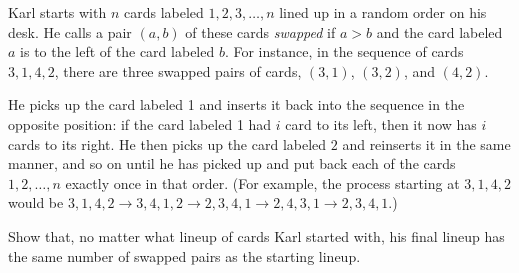 Karl starts with $n$ cards labeled $1,2,3,\dots,n$ lined up in a random order on his desk. He calls a pair $(a,b)$ of these cards \emph{swapped} if $a>b$ and the card labeled $a$ is to the left of the card labeled $b$. For instance, in the sequence of cards $3,1,4,2$, there are three swapped pairs of cards, $(3,1)$, $(3,2)$, and $(4,2)$.

He picks up the card labeled 1 and inserts it back into the sequence in the opposite position: if the card labeled 1 had $i$ card to its left, then it now has $i$ cards to its right. He then picks up the card labeled $2$ and reinserts it in the same manner, and so on until he has picked up and put back each of the cards $1,2,\dots,n$ exactly once in that order. (For example, the process starting at $3,1,4,2$ would be $3,1,4,2\to 3,4,1,2\to 2,3,4,1\to 2,4,3,1\to 2,3,4,1$.)

Show that, no matter what lineup of cards Karl started with, his final lineup has the same number of swapped pairs as the starting lineup.
